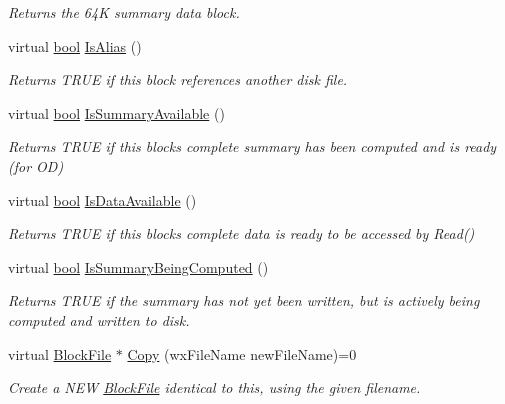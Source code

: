 \begin{DoxyCompactItemize}
\begin{DoxyCompactList}\small\item\em Returns the 64K summary data block. \end{DoxyCompactList}\item 
virtual \hyperlink{mac_2config_2i386_2lib-src_2libsoxr_2soxr-config_8h_abb452686968e48b67397da5f97445f5b}{bool} \hyperlink{class_block_file_a9969d478c861eae0bdb98b71176906cf}{Is\+Alias} ()
\begin{DoxyCompactList}\small\item\em Returns T\+R\+UE if this block references another disk file. \end{DoxyCompactList}\item 
virtual \hyperlink{mac_2config_2i386_2lib-src_2libsoxr_2soxr-config_8h_abb452686968e48b67397da5f97445f5b}{bool} \hyperlink{class_block_file_ada91556581464e844478f51762f50a70}{Is\+Summary\+Available} ()
\begin{DoxyCompactList}\small\item\em Returns T\+R\+UE if this block\textquotesingle{}s complete summary has been computed and is ready (for OD) \end{DoxyCompactList}\item 
virtual \hyperlink{mac_2config_2i386_2lib-src_2libsoxr_2soxr-config_8h_abb452686968e48b67397da5f97445f5b}{bool} \hyperlink{class_block_file_a8908840cad2f547172b3a2373f9dd347}{Is\+Data\+Available} ()
\begin{DoxyCompactList}\small\item\em Returns T\+R\+UE if this block\textquotesingle{}s complete data is ready to be accessed by Read() \end{DoxyCompactList}\item 
virtual \hyperlink{mac_2config_2i386_2lib-src_2libsoxr_2soxr-config_8h_abb452686968e48b67397da5f97445f5b}{bool} \hyperlink{class_block_file_ac7817525642f53db4350e365971fddcc}{Is\+Summary\+Being\+Computed} ()
\begin{DoxyCompactList}\small\item\em Returns T\+R\+UE if the summary has not yet been written, but is actively being computed and written to disk. \end{DoxyCompactList}\item 
virtual \hyperlink{class_block_file}{Block\+File} $\ast$ \hyperlink{class_block_file_a8f7cc554062ef6d356eb0ab7f3229df5}{Copy} (wx\+File\+Name new\+File\+Name)=0
\begin{DoxyCompactList}\small\item\em Create a N\+EW \hyperlink{class_block_file}{Block\+File} identical to this, using the given filename. \end{DoxyCompactList}\item 

\end{DoxyCompactItemize}
